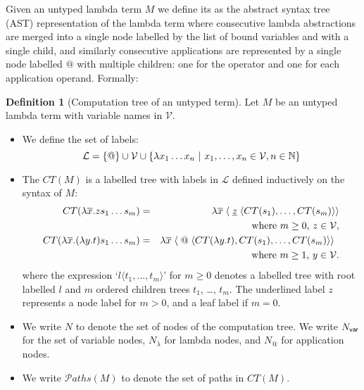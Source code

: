\documentclass{article}
\theoremstyle{definition}
\newtheorem{definition}{Definition}[section]
\newcommand\Nodes{N}%
\newcommand\NodesVar{N_{\sf var}}%
\newcommand\NodesLmd{N_\lambda}%
\newcommand{\ctree}{CT} %
\newcommand\pathset{{\mathcal{P}aths}} %
\begin{document}
Given an untyped lambda term $M$ we define its  as the abstract syntax tree (AST) representation of the lambda term where consecutive lambda abstractions are merged into a single node labelled by the list of bound variables and with a single child, and similarly consecutive applications are represented by a single node labelled $@$ with multiple children: one for the operator and one for each application operand. Formally:
\begin{definition}[Computation tree of an untyped term]
	Let $M$ be an untyped lambda term with variable names in $\mathcal{V}$.
\begin{itemize}
\item We define the set of labels:
    $$ \mathcal{L} = \{ @ \} \cup \mathcal{V} \cup \{ \lambda x_1 \ldots x_n \ | \ x_1 ,\ldots, x_n \in
	\mathcal{V}, n\in\mathbb{N} \}$$
\item
	The  $\ctree(M)$ is a labelled tree with labels in $\mathcal{L}$
    defined inductively on the syntax of $M$:
	\begin{eqnarray*}
		\ctree(\lambda \overline{x} . z s_1 \ldots s_m) &=& \lambda \overline{x}\; \langle\; \underline z\; \langle \ctree(s_1),\ldots,\ctree(s_m)\rangle\rangle\\
		&& \hbox {where $m\geq 0$, $z \in \mathcal{V}$}, \\
 \ctree(\lambda \overline{x} . (\lambda y.t) s_1 \ldots s_m) &=& \lambda \overline{x}\; \langle\; @ \; \langle \ctree(\lambda y.t),\ctree(s_1),\ldots,\ctree(s_m) \rangle \rangle \enspace\\
&&  \hbox{where $m\geq 1$, $y\in \mathcal{V}$}.
	\end{eqnarray*}
where the expression `$l\langle t_1, \ldots, t_m \rangle$' for $m \geq 0$ denotes a labelled tree with root labelled $l$ and $m$ ordered children trees $t_1$, \ldots, $t_m$. The underlined label $z$ represents a node label for $m>0$, and a leaf label if $m=0$.

\item We write $\Nodes$ to denote the set of nodes of the computation tree. We write $\NodesVar$ for the set of variable nodes, $\NodesLmd$ for lambda nodes, and $\Nodes_@$ for  application nodes.

\item We write $\pathset(M)$ to denote the set of paths in $\ctree(M)$.
\end{itemize}
\end{definition}
\end{document}

